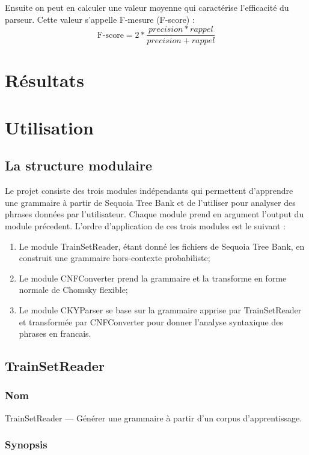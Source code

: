 \documentclass[12pt]{article}
\begin{document}
Ensuite on peut en calculer une valeur moyenne qui caract\'erise l'efficacit\'e
du parseur. Cette valeur s'appelle F-mesure (F-score) :
$$
\text{F-score} = 2*\frac{precision * rappel}{precision + rappel}
$$

\section{R\'esultats}

\section{Utilisation}
\subsection{La structure modulaire}
Le projet consiste des trois modules ind\'ependants qui permettent d'apprendre une
grammaire \`a partir de Sequoia Tree Bank \cite{Sequoia} et de l'utiliser pour
analyser des phrases donn\'ees par l'utilisateur. Chaque module prend en
argument l'output du module pr\'ecedent. L'ordre d'application de ces trois
modules est le suivant :
\begin{enumerate}
  \item Le module TrainSetReader, \'etant donn\'e les fichiers de Sequoia Tree Bank,
  en construit une grammaire hors-contexte probabiliste;
  \item Le module CNFConverter prend la grammaire et la transforme en forme
  normale de Chomsky flexible;
  \item Le module CKYParser se base sur la grammaire apprise par TrainSetReader
  et transform\'ee par CNFConverter pour donner l'analyse syntaxique des phrases
  en francais.
\end{enumerate}

\subsection{TrainSetReader}
\subsubsection{Nom}

TrainSetReader --- G\'en\'erer une grammaire \`a partir d'un corpus d'apprentissage.

\subsubsection{Synopsis}
\end{document}
